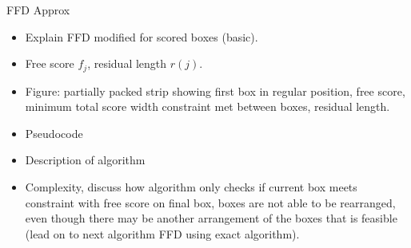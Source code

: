 \documentclass{llncs}
\begin{document}
FFD Approx
\begin{itemize}
	\item Explain FFD modified for scored boxes (basic).
	\item Free score $f_j$, residual length $r(j)$.
	\item Figure: partially packed strip showing first box in regular position, free score, minimum total score width constraint met between boxes, residual length.
	\item Pseudocode
	\item Description of algorithm
	\item Complexity, discuss how algorithm only checks if current box meets constraint with free score on final box, boxes are not able to be rearranged, even though there may be another arrangement of the boxes that is feasible (lead on to next algorithm FFD using exact algorithm).	
\end{itemize}
\end{document}
